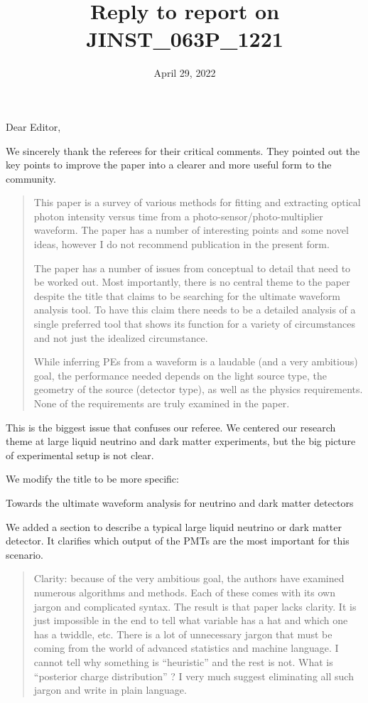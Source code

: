 \documentclass[12pt]{article}
\title{Reply to report on JINST\_063P\_1221}
\date{April 29, 2022}
\begin{document}
\maketitle
Dear Editor,

We sincerely thank the referees for their critical comments.  They pointed out the key points to improve the paper into a clearer and more useful form to the community.

\begin{quote}
This paper is a survey of various methods for fitting and extracting optical photon intensity versus time from a photo-sensor/photo-multiplier waveform. The paper has a number of interesting points and some novel ideas, however I do not recommend publication in the present form.

The paper has a number of issues from conceptual to detail that need to be worked out. Most importantly, there is no central theme to the paper despite the title that claims to be searching for the ultimate waveform analysis tool. To have this claim there needs to be a detailed analysis of a single preferred tool that shows its function for a variety of circumstances and not just the idealized circumstance.

While inferring PEs from a waveform is a laudable (and a very ambitious) goal, the performance needed depends on the light source type, the geometry of the source (detector type), as well as the physics requirements. None of the requirements are truly examined in the paper.
\end{quote}

This is the biggest issue that confuses our referee.  We centered our research theme at large liquid neutrino and dark matter experiments, but the big picture of experimental setup is not clear.

We modify the title to be more specific:

Towards the ultimate waveform analysis for neutrino and dark matter detectors

We added a section to describe a typical large liquid neutrino or dark matter detector.  It clarifies which output of the PMTs are the most important for this scenario.

\begin{quote}
Clarity: because of the very ambitious goal, the authors have examined numerous algorithms and methods. Each of these comes with its own jargon and complicated syntax. The result is that paper lacks clarity. It is just impossible in the end to tell what variable has a hat and which one has a twiddle, etc. There is a lot of unnecessary jargon that must be coming from the world of advanced statistics and machine language. I cannot tell why something is ``heuristic'' and the rest is not. What is ``posterior charge distribution'' ? I very much suggest eliminating all such jargon and write in plain language.
\end{quote}
\end{document}
